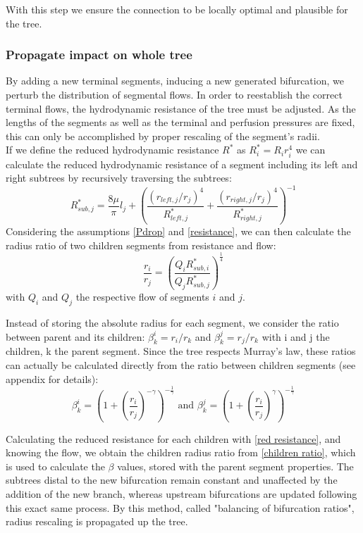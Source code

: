 \documentclass[a4paper, 11pt]{article} %
\begin{document}
With this step we ensure the connection to be locally optimal and plausible for the tree.

\subsubsection{Propagate impact on whole tree}
By adding a new terminal segments, inducing a new generated bifurcation, we perturb the distribution of segmental flows. In order to reestablish the correct terminal flows, the hydrodynamic resistance of the tree must be adjusted. As the lengths of the segments as well as the terminal and perfusion pressures are fixed, this can only be accomplished by proper rescaling of the segment's radii.\\

If we define the reduced hydrodynamic resistance $R^*$ as $R^*_i = R_i r_i^4$ we can calculate the reduced hydrodynamic resistance of a segment including its left and right subtrees by recursively traversing the subtrees:
\begin{equation} \label{red resistance}
R^*_{sub,j} = \frac{8\mu}{\pi}l_j + \left( \frac{(r_{left,j}/r_j)^4}{R_{left,j}^*} + \frac{(r_{right,j}/r_j)^4}{R_{right,j}^*}\right)^{-1}
\end{equation}
Considering the assumptions \ref{Pdrop} and \ref{resistance}, we can then calculate the radius ratio of two children segments from resistance and flow:
\begin{equation} \label{children ratio}
\frac{r_i}{r_j} = \left(\frac{Q_iR_{sub,i}^*}{Q_jR_{sub,j}^*}\right)^\frac{1}{4}
\end{equation}
with $Q_i$ and $Q_j$ the respective flow of segments $i$ and $j$.

Instead of storing the absolute radius for each segment, we consider the ratio between parent and its children: $\beta^i_k = r_i / r_k$ and $\beta^j_k = r_j / r_k$ with i and j the children, k the parent segment. Since the tree respects Murray's law, these ratios can actually be calculated directly from the ratio between children segments (see appendix for details):
\begin{equation}
\beta^i_k = \left( 1 + (\frac{r_i}{r_j})^{-\gamma}\right)^{-\frac{1}{\gamma}} \text{ and }
\beta^j_k = \left( 1 + (\frac{r_i}{r_j})^{\gamma}\right)^{-\frac{1}{\gamma}}
\end{equation}


Calculating the reduced resistance for each children with \eqref{red resistance}, and knowing the flow, we obtain the children radius ratio from \eqref{children ratio}, which is used to calculate the $\beta$ values, stored with the parent segment properties. 
The subtrees distal to the new bifurcation remain constant and unaffected by the addition of the new branch, whereas upstream bifurcations are updated following this exact same process. By this method, called "balancing of bifurcation ratios", radius rescaling is propagated up the tree.
 
\end{document}
